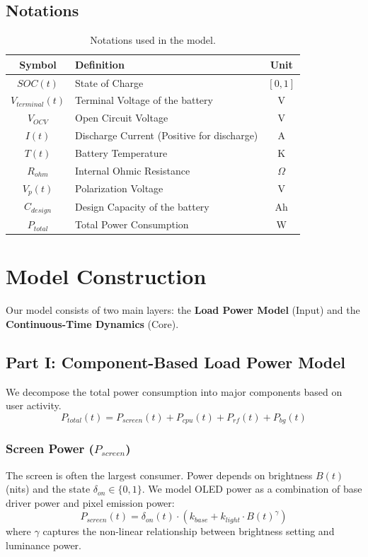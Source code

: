 \documentclass[12pt]{article}
\begin{document}
\subsection{Notations}
\begin{table}[H]
\centering
\begin{tabular}{clc}
\toprule
Symbol & Definition & Unit \\
\midrule
$SOC(t)$ & State of Charge & $[0, 1]$ \\
$V_{terminal}(t)$ & Terminal Voltage of the battery & V \\
$V_{OCV}$ & Open Circuit Voltage & V \\
$I(t)$ & Discharge Current (Positive for discharge) & A \\
$T(t)$ & Battery Temperature & K \\
$R_{ohm}$ & Internal Ohmic Resistance & $\Omega$ \\
$V_p(t)$ & Polarization Voltage & V \\
$C_{design}$ & Design Capacity of the battery & Ah \\
$P_{total}$ & Total Power Consumption & W \\
\bottomrule
\end{tabular}
\caption{Notations used in the model.}
\label{tab:notations}
\end{table}

\section{Model Construction}

Our model consists of two main layers: the \textbf{Load Power Model} (Input) and the \textbf{Continuous-Time Dynamics} (Core).

\subsection{Part I: Component-Based Load Power Model}
We decompose the total power consumption into major components based on user activity.
\begin{equation}
    P_{total}(t) = P_{screen}(t) + P_{cpu}(t) + P_{rf}(t) + P_{bg}(t)
\end{equation}

\subsubsection{Screen Power ($P_{screen}$)}
The screen is often the largest consumer. Power depends on brightness $B(t)$ (nits) and the state $\delta_{on} \in \{0,1\}$. We model OLED power as a combination of base driver power and pixel emission power:
\begin{equation}
    P_{screen}(t) = \delta_{on}(t) \cdot (k_{base} + k_{light} \cdot B(t)^{\gamma})
\end{equation}
where $\gamma$ captures the non-linear relationship between brightness setting and luminance power.
\end{document}
